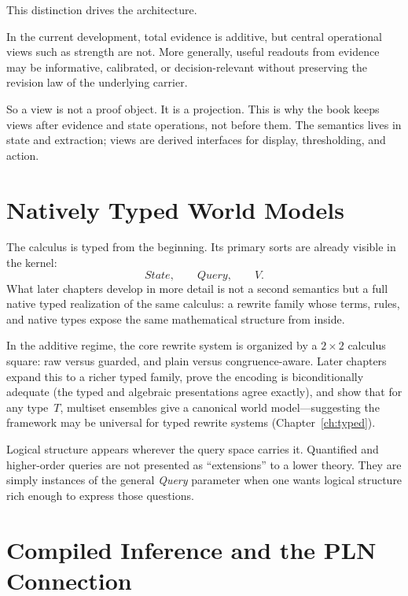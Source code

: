 \documentclass[11pt,openany]{report}
\begin{document}
This distinction drives the architecture.

\begin{proposition}
\label{prop:overview-views-not-semantic-core}
In the current development, total evidence is additive, but central operational
views such as strength are not.  More generally, useful readouts from evidence
may be informative, calibrated, or decision-relevant without preserving the
revision law of the underlying carrier.
\end{proposition}

So a view is not a proof object.  It is a projection.  This is why the book keeps
views after evidence and state operations, not before them.  The semantics lives
in state and extraction; views are derived interfaces for display, thresholding,
and action.

\section{Natively Typed World Models}
\label{sec:overview-typed}

The calculus is typed from the beginning.  Its primary sorts are already
visible in the kernel:
\[
  \textit{State}, \qquad \textit{Query}, \qquad V.
\]
What later chapters develop in more detail is not a second semantics but a
full native typed realization of the same calculus: a rewrite family whose
terms, rules, and native types expose the same mathematical structure from
inside.

In the additive regime, the core rewrite system is organized by a
$2 \times 2$ calculus square: raw versus guarded, and plain versus
congruence-aware.  Later chapters expand this to a richer typed
family, prove the encoding is biconditionally adequate (the typed
and algebraic presentations agree exactly), and show that for any
type~$T$, multiset ensembles give a canonical world
model---suggesting the framework may be universal for typed
rewrite systems (Chapter~\ref{ch:typed}).

Logical structure appears wherever the query space carries it.  Quantified and
higher-order queries are not presented as ``extensions'' to a lower theory.
They are simply instances of the general \textit{Query} parameter when one wants
logical structure rich enough to express those questions.

\section{Compiled Inference and the PLN Connection}
\label{sec:overview-compiled}
\end{document}
